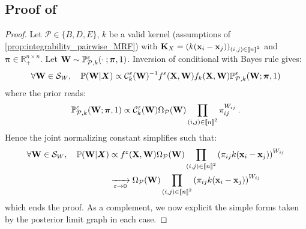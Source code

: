 \subsection{Proof of }
\label{proof:posterior_limit}

\posteriorW

\begin{proof}
Let $\mathcal{P} \in \{B, D, E\}$, $k$ be a valid kernel (assumptions of \cref{prop:integrability_pairwise_MRF}) with $\mathbf{K}_{X} = (k(\mathbf{x}_{i} - \mathbf{x}_{j}))_{(i,j) \in {[\![n]\!]}^2}$ and $\bm{\pi} \in \mathbb{R}_+^{n \times n}$. Let $\mathbf{W} \sim \mathbb{P}_{\mathcal{P},k}^{\varepsilon}(\cdot \: ; \bm{\pi},1)$. Inversion of conditional with Bayes rule gives:
\begin{align}
    \forall {\mathbf{W}} \in \mathcal{S}_{W}, \quad \mathbb{P}(\mathbf{W} | \bm{X}) \propto
    \mathcal{C}_{k}^{\varepsilon}(\mathbf{W})^{-1} f^{\varepsilon}(\mathbf{X}, \mathbf{W}) f_{k}(\mathbf{X}, \mathbf{W}) \mathbb{P}^{\varepsilon}_{\mathcal{P},k}(\mathbf{W}; \bm{\pi}, 1) \label{inversion_Conditional}
\end{align}
where the prior reads:
\begin{align}
    \mathbb{P}_{\mathcal{P},k}^{\varepsilon}({\mathbf{W}}; \bm{\pi}, 1) \propto \mathcal{C}^{\varepsilon}_k(\mathbf{W}) \Omega_{\mathcal{P}}(\mathbf{W}) \prod_{(i,j) \in {[\![n]\!]}^2} \pi_{ij}^{W_{ij}} \:.
\end{align}
Hence the joint normalizing constant simplifies such that:
\begin{align}
    \forall {\mathbf{W}} \in \mathcal{S}_{W}, \quad \mathbb{P}(\mathbf{W} | \bm{X}) &\propto
    f^{\varepsilon}(\mathbf{X}, \mathbf{W}) \Omega_{\mathcal{P}}(\mathbf{W}) \prod_{(i,j) \in {[\![n]\!]}^2} \left(\pi_{ij} k(\mathbf{x}_i - \mathbf{x}_j)\right)^{W_{ij}} \\
    &\xrightarrow[\varepsilon \to 0]{} \Omega_{\mathcal{P}}(\mathbf{W}) \prod_{(i,j) \in {[\![n]\!]}^2}  \left(\pi_{ij} k(\mathbf{x}_i - \mathbf{x}_j)\right)^{W_{ij}}
\end{align}
which ends the proof. As a complement, we now explicit the simple forms taken by the posterior limit graph in each case.


\end{proof}
